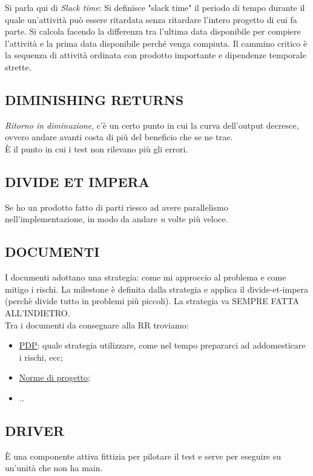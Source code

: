 		Si parla qui di \textit{Slack time}: Si definisce "slack time" il periodo di tempo durante il quale un'attività può essere ritardata senza ritardare l'intero progetto di cui fa parte. Si calcola facendo la differenza tra l'ultima data disponibile per compiere l'attività e la prima data disponibile perché venga compiuta. Il cammino critico è la sequenza di attività ordinata con prodotto importante e dipendenze temporale strette.
		
		\subsection{DIMINISHING RETURNS}		\label{diminishingreturn}	%
		\textit{Ritorno in diminuzione}, c'è un certo punto in cui la curva dell'output decresce, ovvero andare avanti costa di più del beneficio che se ne trae. \\
		È il punto in cui i test non rilevano più gli errori.
		
		\subsection{DIVIDE ET IMPERA}	 \label{divideetimpera}		
		Se ho un prodotto fatto di parti riesco ad avere parallelismo nell'implementazione, in modo da andare \textit{n} volte più veloce.
		
		\subsection{DOCUMENTI}		\label{documenti}	%
		I documenti adottano una strategia: come mi approccio al problema e come mitigo i rischi. La milestone è definita dalla strategia e applica il divide-et-impera (perchè divide tutto in problemi più piccoli). La strategia va SEMPRE FATTA ALL'INDIETRO. \\
		Tra i documenti da consegnare alla RR troviamo:
		\begin{itemize}
			\item \underline{\hyperref[piano]{PDP}}: quale strategia utilizzare, come nel tempo prepararci ad addomesticare i rischi, ecc;
			\item \underline{\hyperref[norme]{Norme di progetto}};
			\item ..
		\end{itemize} 
	
		\subsection{DRIVER}		\label{driver}
		È una componente attiva fittizia per pilotare il test e serve per eseguire su un'unità che non ha main.
	

